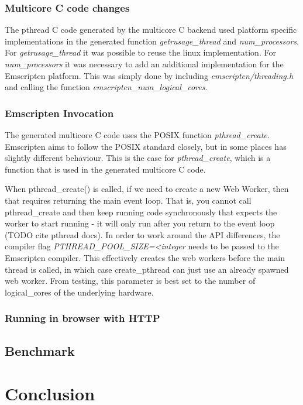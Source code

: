 \documentclass[11pt]{book}
\begin{document}
\subsection{Multicore C code changes}
The pthread C code generated by the multicore C backend used platform specific implementations in the generated function \textit{getrusage\_thread} and \textit{num\_processors}. For \textit{getrusage\_thread} it was possible to reuse the linux implementation. For \textit{num\_processors} it was necessary to add an additional implementation for the Emscripten platform. This was simply done by including \textit{emscripten/threading.h} and calling the function \textit{emscripten\_num\_logical\_cores}.




\subsection{Emscripten Invocation}

The generated multicore C code uses the POSIX function \textit{pthread\_create}. Emscripten aims to follow the POSIX standard closely, but in some places has slightly different behaviour. This is the case for \textit{pthread\_create}, which is a function that is used in the generated multicore C code. 

When pthread\_create() is called, if we need to create a new Web Worker, then that requires returning the main event loop. That is, you cannot call pthread\_create and then keep running code synchronously that expects the worker to start running - it will only run after you return to the event loop (TODO cite pthread docs). In order to work around the API differences, the compiler flag \textit{PTHREAD\_POOL\_SIZE=<integer} needs to be passed to the Emscripten compiler. This effectively creates the web workers before the main thread is called, in which case create\_pthread can just use an already spawned web worker. From testing, this parameter is best set to the number of logical\_cores of the underlying hardware.



\subsection{Running in browser with HTTP}



\section{Benchmark}






\chapter{Conclusion}
\end{document}
